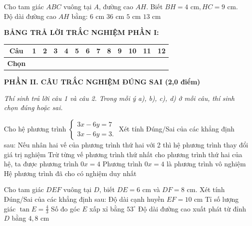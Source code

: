 \documentclass[12pt,a4paper]{article}
\begin{document}
\begin{ex}
Cho tam giác $ABC$ vuông tại $A$, đường cao $AH$. Biết $BH = 4\text{ cm}, HC = 9\text{ cm}$. Độ dài đường cao $AH$ bằng:
\choice
{\True $6\text{ cm}$}
{$36\text{ cm}$}
{$5\text{ cm}$}
{$13\text{ cm}$}
\end{ex}


\vspace{1mm}
\noindent\textbf{BẢNG TRẢ LỜI TRẮC NGHIỆM PHẦN I:}
\begin{center}
\begin{tabular}{|c|c|c|c|c|c|c|c|c|c|c|c|c|}
\hline
\textbf{Câu} & \textbf{1} & \textbf{2} & \textbf{3} & \textbf{4} & \textbf{5} & \textbf{6} & \textbf{7} & \textbf{8} & \textbf{9} & \textbf{10} & \textbf{11} & \textbf{12} \\
\hline
\textbf{Chọn} & \rule{0pt}{0.65cm} & & & & & & & & & & & \\
\hline
\end{tabular}
\end{center}
\vspace{2mm}

\setcounter{ex}{0}
\noindent\textbf{\large PHẦN II. CÂU TRẮC NGHIỆM ĐÚNG SAI (2,0 điểm)}

\textit{Thí sinh trả lời câu 1 và câu 2. Trong mỗi ý a), b), c), d) ở mỗi câu, thí sinh chọn đúng hoặc sai.}

\vspace{1mm}
\begin{ex}
Cho hệ phương trình $\begin{cases} 3x - 6y = 7 \\ 3x - 6y = 3. \end{cases}$ Xét tính Đúng/Sai của các khẳng định sau:
\choiceTF
{\True Nếu nhân hai vế của phương trình thứ hai với 2 thì hệ phương trình thay đổi giá trị nghiệm}
{\True Trừ từng vế phương trình thứ nhất cho phương trình thứ hai của hệ, ta được phương trình $0x = 4$}
{\True Phương trình $0x = 4$ là phương trình vô nghiệm}
{Hệ phương trình đã cho có nghiệm duy nhất}
\end{ex}

\begin{ex}
Cho tam giác $DEF$ vuông tại $D$, biết $DE = 6\text{ cm}$ và $DF = 8\text{ cm}$. Xét tính Đúng/Sai của các khẳng định sau:
\choiceTF
{\True Độ dài cạnh huyền $EF = 10\text{ cm}$}
{\True Tỉ số lượng giác $\tan E = \frac{4}{3}$}
{\True Số đo góc $E$ xấp xỉ bằng $53^\circ$}
{\True Độ dài đường cao xuất phát từ đỉnh $D$ bằng $4{,}8\text{ cm}$}
\end{ex}
\end{document}
